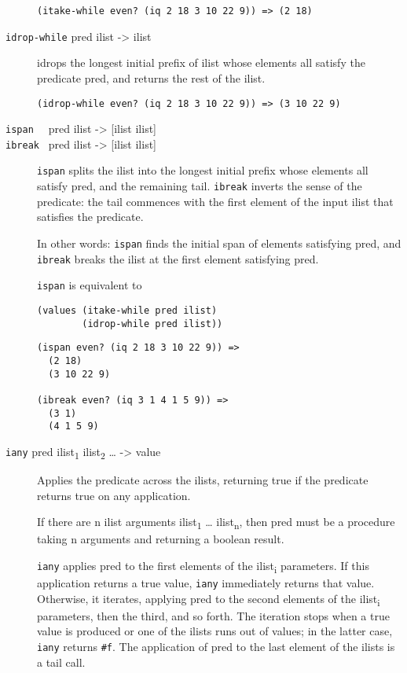 \begin{description}
\begin{verbatim}
(itake-while even? (iq 2 18 3 10 22 9)) => (2 18)
\end{verbatim}
\item[ \href{}{} \texttt{idrop-while} pred ilist -\textgreater{} ilist ]
idrops the longest initial prefix of ilist whose elements all satisfy
the predicate pred, and returns the rest of the ilist.

\begin{verbatim}
(idrop-while even? (iq 2 18 3 10 22 9)) => (3 10 22 9)
\end{verbatim}
\item[ \href{}{} \texttt{ispan~~} pred ilist -\textgreater{} {[}ilist
ilist{]}\\
\href{}{} \texttt{ibreak~} pred ilist -\textgreater{} {[}ilist ilist{]}
]
\texttt{ispan} splits the ilist into the longest initial prefix whose
elements all satisfy pred, and the remaining tail. \texttt{ibreak}
inverts the sense of the predicate: the tail commences with the first
element of the input ilist that satisfies the predicate.

In other words: \texttt{ispan} finds the initial span of elements
satisfying pred, and \texttt{ibreak} breaks the ilist at the first
element satisfying pred.

\texttt{ispan} is equivalent to

\begin{verbatim}
(values (itake-while pred ilist) 
        (idrop-while pred ilist))
\end{verbatim}

\begin{verbatim}
(ispan even? (iq 2 18 3 10 22 9)) =>
  (2 18)
  (3 10 22 9)

(ibreak even? (iq 3 1 4 1 5 9)) =>
  (3 1)
  (4 1 5 9)
\end{verbatim}
\item[ \href{}{} \texttt{iany} pred ilist\textsubscript{1}
ilist\textsubscript{2} \ldots{} -\textgreater{} value ]
Applies the predicate across the ilists, returning true if the predicate
returns true on any application.

If there are n ilist arguments ilist\textsubscript{1} \ldots{}
ilist\textsubscript{n}, then pred must be a procedure taking n arguments
and returning a boolean result.

\texttt{iany} applies pred to the first elements of the
ilist\textsubscript{i} parameters. If this application returns a true
value, \texttt{iany} immediately returns that value. Otherwise, it
iterates, applying pred to the second elements of the
ilist\textsubscript{i} parameters, then the third, and so forth. The
iteration stops when a true value is produced or one of the ilists runs
out of values; in the latter case, \texttt{iany} returns \texttt{\#f}.
The application of pred to the last element of the ilists is a tail
call.


\end{description}
